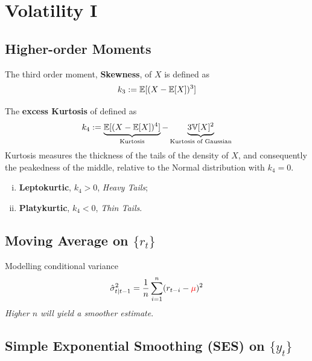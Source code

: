 \documentclass[11pt]{article}
\begin{document}
	\section{Volatility I}
		\subsection{Higher-order Moments}
			\begin{definition}
				The third order moment, \textbf{Skewness}, of $X$ is defined as 
				\begin{equation}
					k_3 := \mathbb{E}[{(X - \mathbb{E}[{X}])^3}]
				\end{equation}
			\end{definition}
			
			\begin{definition}
				The \textbf{excess Kurtosis} of defined as
				\begin{equation}
					k_4 := \underbrace{\mathbb{E}[{(X - \mathbb{E}[{X}])^4}]}_{\text{{Kurtosis}}} - \underbrace{3 \mathbb{V}[{X}]^2}_{\text{{Kurtosis of Gaussian}}}
				\end{equation}
				Kurtosis measures the thickness of the tails of the density of $X$, and consequently the peakedness of the middle, relative to the Normal distribution with $k_4 = 0$.
				\begin{enumerate}[(i)]
					\item \textbf{Leptokurtic}, $k_4 > 0$, \emph{Heavy Tails};
					\item \textbf{Platykurtic}, $k_4 < 0$, \emph{Thin Tails}.
				\end{enumerate}
			\end{definition}
		
		\subsection{Moving Average on $\{r_t\}$}
			\begin{definition}
				Modelling conditional variance
				\begin{equation}
					\hat{\sigma}^2_{t|t-1} = \frac{1}{n} \sum_{i=1}^n (r_{t-i} - \textcolor{red}{\mu})^2
				\end{equation}
				\emph{Higher $n$ will yield a smoother estimate}.
			\end{definition}
		
		\subsection{Simple Exponential Smoothing (SES) on $\{y_t\}$}
\end{document}
